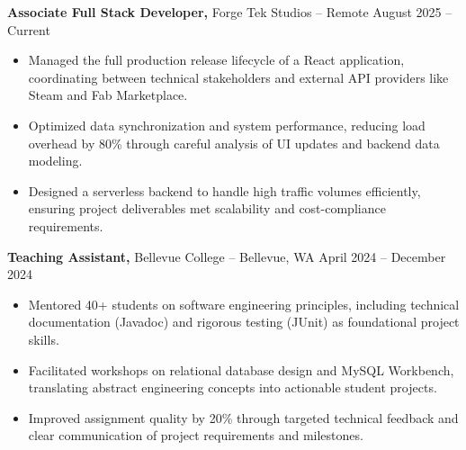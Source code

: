 \documentclass[11pt]{article}       %
\begin{document}
\textbf{Associate Full Stack Developer,} {Forge Tek Studios} -- Remote \hfill August 2025 -- Current 
\vspace{-9pt}
\begin{itemize}
  \item Managed the full production release lifecycle of a React application, coordinating between technical stakeholders and external API providers like Steam and Fab Marketplace.
  \item Optimized data synchronization and system performance, reducing load overhead by 80\% through careful analysis of UI updates and backend data modeling.
  \item Designed a serverless backend to handle high traffic volumes efficiently, ensuring project deliverables met scalability and cost-compliance requirements.
\end{itemize}

\textbf{Teaching Assistant,} {Bellevue College} -- Bellevue, WA \hfill April 2024 -- December 2024 \\
\vspace{-9pt}
\begin{itemize}
  \item Mentored 40+ students on software engineering principles, including technical documentation (Javadoc) and rigorous testing (JUnit) as foundational project skills.
  \item Facilitated workshops on relational database design and MySQL Workbench, translating abstract engineering concepts into actionable student projects.
  \item Improved assignment quality by 20\% through targeted technical feedback and clear communication of project requirements and milestones.
\end{itemize}

\end{document}
